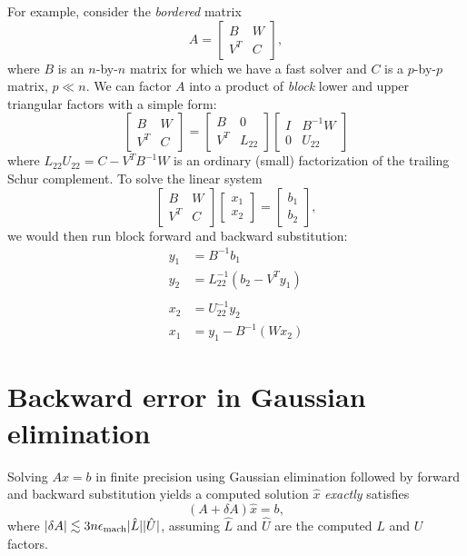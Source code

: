 \documentclass[12pt, leqno]{article} %
\begin{document}
For example, consider the {\em bordered} matrix
\[
  A = \begin{bmatrix} B & W \\ V^T & C \end{bmatrix},
\]
where $B$ is an $n$-by-$n$ matrix for which we have a fast
solver and $C$ is a $p$-by-$p$ matrix, $p \ll n$.
We can factor $A$ into a product of {\em block} lower and
upper triangular factors with a simple form:
\[
  \begin{bmatrix} B & W \\ V^T & C \end{bmatrix} =
  \begin{bmatrix} B   & 0 \\ V^T & L_{22} \end{bmatrix}
  \begin{bmatrix} I & B^{-1} W \\ 0 & U_{22} \end{bmatrix}
\]
where $L_{22} U_{22} = C-V^T B^{-1} W$ is an ordinary (small) factorization
of the trailing Schur complement.  To solve the linear system
\[
  \begin{bmatrix} B & W \\ V^T & C \end{bmatrix}
  \begin{bmatrix} x_1 \\ x_2 \end{bmatrix} =
  \begin{bmatrix} b_1 \\ b_2 \end{bmatrix},
\]
we would then run block forward and backward substitution:
\begin{align*}
  y_1 &= B^{-1} b_1 \\
  y_2 &= L_{22}^{-1} \left( b_2 - V^T y_1 \right) \\
\\
  x_2 &= U_{22}^{-1} y_2 \\
  x_1 &= y_1-B^{-1} (W x_2)
\end{align*}

\section{Backward error in Gaussian elimination}

Solving $Ax = b$ in finite precision using Gaussian elimination
followed by forward and backward substitution yields a computed
solution $\hat{x}$ {\em exactly} satisfies
\begin{equation} \label{gauss-bnd}
  (A + \delta A) \hat{x} = b,
\end{equation}
where $|\delta A| \lesssim 3n\epsilon_{\mathrm{mach}} |\hat{L}| |\hat{U}|$, assuming
$\hat{L}$ and $\hat{U}$ are the computed $L$ and $U$ factors.
\end{document}
